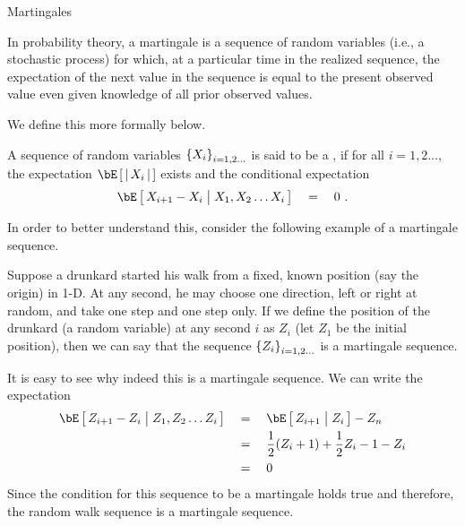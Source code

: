 \documentclass{article}
\begin{document}
\begin{ssection}{Martingales}
	
	In probability theory, a martingale is a sequence of random variables (i.e., a stochastic process) for which, at a particular time in the realized sequence, the expectation of the next value in the sequence is equal to the present observed value even given knowledge of all prior observed values. \cite{martingale-wiki}
	
	We define this more formally below. \br
	
	\begin{definition}[Martingale]
		A sequence of random variables $\left\{ {X_i} \right\}_{i = 1, 2 \dots}$ is said to be a , if for all $i = 1, 2 \dots$, the expectation $\E{\abs{X_i}}$ exists and the conditional expectation
		\begin{align*}
			\E{X_{i + 1} - X_i \pipe X_1, X_2 \dots X_i}	\eq	0 \ . 
		\end{align*}
		\label{def:martingale}
	\end{definition}
	
	In order to better understand this, consider the following example of a martingale sequence. \br
	
	\begin{example}
		Suppose a drunkard started his walk from a fixed, known position (say the origin) in 1-D. At any second, he may choose one direction, \ie left or right at random, and take one step and one step only. If we define the position of the drunkard (a random variable) at any second $i$ as $Z_i$ (let $Z_1$ be the initial position), then we can say that the sequence $\left\{ {Z_i} \right\}_{i = 1, 2 \dots}$ is a martingale sequence.
		
		It is easy to see why indeed this is a martingale sequence. We can write the expectation
		\begin{align*}
			\E{Z_{i + 1} - Z_i \pipe Z_1, Z_2 \dots Z_i} & \eq	\E{Z_{i + 1} \pipe Z_i} - Z_n                      \\
			                                             & \eq	\frac{1}{2} (Z_i + 1) + \frac{1}{2}{Z_i - 1} - Z_i \\
			                                             & \eq	0                                                  
		\end{align*}
		Since the condition for this sequence to be a martingale holds true and therefore, the random walk sequence is a martingale sequence.
	\end{example} \br
	

\end{ssection}
\end{document}
